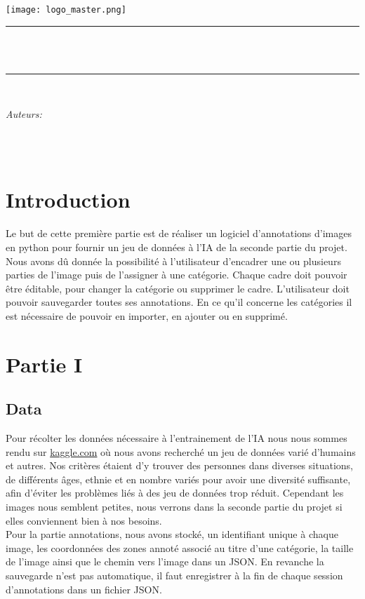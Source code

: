 \documentclass[a4paper,12pt]{article}
\makeatletter
\def\maketitle{
  \begin{center}\leavevmode
       \normalfont
       \texttt{[image: logo\_master.png]}
       \vskip 0.5cm
       \textsc{\large \department}\\
       \vskip 1.5cm
       \rule{\linewidth}{0.2 mm} \\
       {\large \exam}\\[1 cm]
       {\huge \bfseries \@title \par}
       \vspace{1cm}
	\rule{\linewidth}{0.2 mm} \\[1.5 cm]

	\begin{minipage}[t]{0.45\textwidth}
		\begin{flushleft} \large
			\emph{Auteurs:}\\
			\@author\\
		\end{flushleft}
	\end{minipage}
	\begin{minipage}[t]{0.45\textwidth}
	    \begin{flushright} \large
			\ifdefempty{\supervisortwo}{\emph{Supervisor:\\}}{\emph{Professeur:\\}}
			\supervisorone\\
			\ifdefempty{\supervisortwo}{}{\supervisortwo\\}
		\end{flushright}
	\end{minipage}
	\vfill
	{\Large \@date\par}
   \end{center}
   \cleardoublepage
  }
\makeatother
\begin{document}

\maketitle

\tableofcontents

\newpage



\section{Introduction}
Le but de cette première partie est de réaliser un logiciel d’annotations d’images en python pour fournir un jeu de données à l’IA de la seconde partie du projet.\\

Nous avons dû donnée la possibilité à l'utilisateur d'encadrer une ou plusieurs parties de l'image puis de l'assigner à une catégorie. Chaque cadre doit pouvoir être éditable, pour changer la catégorie ou supprimer le cadre. L’utilisateur doit pouvoir sauvegarder toutes ses annotations. En ce qu'il concerne les catégories il est nécessaire de pouvoir en importer, en ajouter ou en supprimé.


\section{Partie I}
\subsection{Data}
Pour récolter les données nécessaire à l'entrainement de l'IA nous nous sommes rendu sur \href{https://www.kaggle.com/swann00/masque-vs-sans-masque}{kaggle.com} où nous avons recherché un jeu de données varié d'humains et autres. Nos critères étaient d'y trouver des personnes dans diverses situations, de différents âges, ethnie et en nombre variés pour avoir une diversité suffisante, afin d'éviter les problèmes liés à des jeu de données trop réduit. Cependant les images nous semblent petites, nous verrons dans la seconde partie du projet si elles conviennent bien à nos besoins.\\

Pour la partie annotations, nous avons stocké, un identifiant unique à chaque image, les coordonnées des zones annoté associé au titre d'une catégorie, la taille de l'image ainsi que le chemin vers l'image dans un JSON. En revanche la sauvegarde n'est pas automatique, il faut enregistrer à la fin de chaque session d'annotations dans un fichier JSON.
\end{document}
